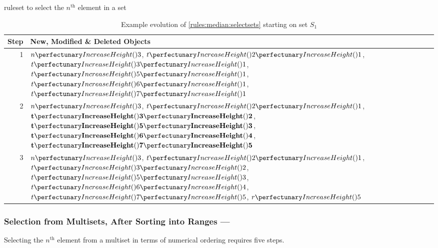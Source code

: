 \begin{cprulesetfloat}
\begin{cpruleset}


\end{cpruleset}
\caption{\label{rules:median:selectsets}\Gls{ruleset} to select the \(n^{\text{th}}\) element in a set}
\end{cprulesetfloat}

\begin{table}[htbp]
\centering
   \begin{tabular}{|r|l|}
    \hline
    \textbf{Step} & \textbf{New, Modified \& Deleted Objects} \\ \hline
    1 & \(\cpfunc{n}{3}\), \(\cpfuncn{t}{2}{1}\), \(\cpfuncn{t}{3}{1}\), \(\cpfuncn{t}{5}{1}\), \(\cpfuncn{t}{6}{1}\), \(\cpfuncn{t}{7}{1}\)\\ \hline
    
    2 & \(\cpfunc{n}{3}\), \(\cpfuncn{t}{2}{1}\), \(\mathbf{\cpfuncn{t}{3}{2}}\), \(\mathbf{\cpfuncn{t}{5}{3}}\), \(\mathbf{\cpfuncn{t}{6}{4}}\), \(\mathbf{\cpfuncn{t}{7}{5}}\)\\ \hline
    
    3 & \(\cpfunc{n}{3}\), \(\cpfuncn{t}{2}{1}\), \(\cpfuncn{t}{3}{2}\), \(\cpfuncn{t}{5}{3}\), \(\cpfuncn{t}{6}{4}\), \(\cpfuncn{t}{7}{5}\), \(\cpfunc{r}{5}\)\\ \hline

\end{tabular} 
\caption[Example evolution of \cref{rules:median:selectsets} to select the \(n^{\text{th}}\) element in a set]{\label{tab:median:selectsets}Example evolution of \cref{rules:median:selectsets} starting on set \(S_1\)}
\end{table}

\subsubsection{Selection from Multisets, After Sorting into Ranges --- }\label{sec:median:selectmultisetrange}

\begin{proposition}\label{prop:median:selectmultisetrange}
Selecting the \(n^{\text{th}}\) element from a multiset in terms of numerical ordering requires five steps.
\end{proposition}

